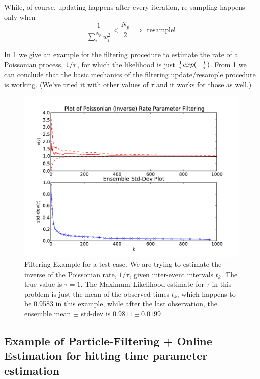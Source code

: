 \documentclass{article}
\begin{document}
While, of course, updating happens after every iteration, re-sampling happens
only when  
$$ \frac{1}{\sum_i^{N_p} w_i^2} < \frac {N_p}{2} \implies \textrm{ resample!}$$

In \cref{fig:poissonian_rate_filtering} we give an example for the filtering
procedure to estimate the rate of a Poissonian process, $1/{\tau}$, for which  the
likelihood is just $\tfrac 1{{\tau}} exp(- \tfrac t{{\tau}})$. From
\cref{fig:poissonian_rate_filtering} we can conclude that the basic mechanics of
the filtering update/resample procedure is working. (We've tried it with other
values of $\tau$ and it works for those as well.)

\begin{figure}[htp]
\begin{center}
  \includegraphics[width=\textwidth]{Figs/TauParticleEnsemble/poisson_rate_filtering.pdf}
  \caption{Filtering Example for a test-case. We are trying to estimate the
  inverse of the Poissonian rate, $1/\tau$, given inter-event intervals $t_k$.
  The true value is $\tau  = 1$. The Maximum Likelihood estimate for $\tau$ in
  this problem  is just the mean of the observed times $\bar{t_k}$, which
  happens to be 0.9583 in this example, while after the last observation, the
  ensemble mean $\pm$ std-dev is $0.9811\pm 0.0199$}
  \label{fig:poissonian_rate_filtering}
\end{center}
\end{figure}


\subsection{Example of Particle-Filtering + Online Estimation for hitting time
parameter estimation}
\end{document}
